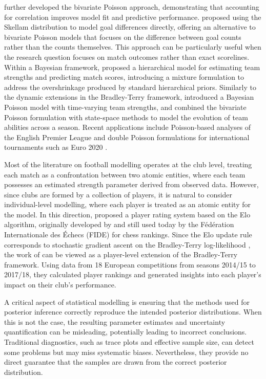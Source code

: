 \textcite{karlis_2003} further developed the bivariate Poisson approach, demonstrating that accounting for correlation improves model fit and predictive performance.
\textcite{karlis_2009} proposed using the Skellam distribution to model goal differences directly, offering an alternative to bivariate Poisson models that focuses on the difference between goal counts rather than the counts themselves.
This approach can be particularly useful when the research question focuses on match outcomes rather than exact scorelines.
Within a Bayesian framework, \textcite{baio_2010} proposed a hierarchical model for estimating team strengths and predicting match scores, introducing a mixture formulation to address the overshrinkage produced by standard hierarchical priors.
Similarly to the dynamic extensions in the Bradley-Terry framework, \textcite{rue_2000} introduced a Bayesian Poisson model with time-varying team strengths, and \textcite{koopman_2015} combined the bivariate Poisson formulation with state-space methods to model the evolution of team abilities across a season.
Recent applications include Poisson-based analyses of the English Premier League \cite{nguyen_2021} and double Poisson formulations for international tournaments such as Euro 2020 \cite{penn_2022}.

Most of the literature on football modelling operates at the club level, treating each match as a confrontation between two atomic entities, where each team possesses an estimated strength parameter derived from observed data.
However, since clubs are formed by a collection of players, it is natural to consider individual-level modelling, where each player is treated as an atomic entity for the model.
In this direction, \textcite{wolf_2020} proposed a player rating system based on the Elo algorithm, originally developed by \textcite{elo_1961} and still used today by the Fédération Internationale des Échecs (FIDE) for chess rankings.
Since the Elo update rule corresponds to stochastic gradient ascent on the Bradley-Terry log-likelihood \cite{aldous_2017}, the work of \textcite{wolf_2020} can be viewed as a player-level extension of the Bradley-Terry framework.
Using data from 18 European competitions from seasons 2014/15 to 2017/18, they calculated player rankings and generated insights into each player's impact on their club's performance.

A critical aspect of statistical modelling is ensuring that the methods used for posterior inference correctly reproduce the intended posterior distributions.
When this is not the case, the resulting parameter estimates and uncertainty quantification can be misleading, potentially leading to incorrect conclusions.
Traditional diagnostics, such as trace plots and effective sample size, can detect some problems but may miss systematic biases.
Nevertheless, they provide no direct guarantee that the samples are drawn from the correct posterior distribution.

